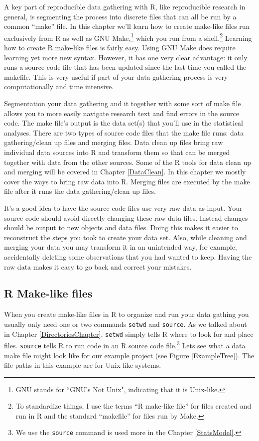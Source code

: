 A key part of reproducible data gathering with R, like reproducible research in general, is segmenting the process into discrete files that can all be run by a common ``make'' file. In this chapter we'll learn how to create make-like files run exclusively from R as well as GNU Make,\footnote{GNU stands for ``GNU's Not Unix", indicating that it is Unix-like.} which you run from a shell.\footnote{To standardize things, I use the terms ``R make-like file'' for files created and run in R and the standard ``makefile'' for files run by Make.} Learning how to create R make-like files is fairly easy. Using GNU Make does require learning yet more new syntax. However, it has one very clear advantage: it only runs a source code file that has been updated since the last time you called the makefile. This is very useful if part of your data gathering process is very computationally and time intensive.

Segmentation your data gathering and it together with some sort of make file allows you to more easily navigate research text and find errors in the source code. The make file's output is the data set(s) that you'll use in the statistical analyses. There are two types of source code files that the make file runs: data gathering/clean up files and merging files. Data clean up files bring raw individual data sources into R and transform them so that can be merged together with data from the other sources. Some of the R tools for data clean up and merging will be covered in Chapter \ref{DataClean}. In this chapter we mostly cover the ways to bring raw data into R. Merging files are executed by the make file after it runs the data gathering/clean up files.

It's a good idea to have the source code files use very raw data as input. Your source code should avoid directly changing these raw data files. Instead changes should be output to new objects and data files. Doing this makes it easier to reconstruct the steps you took to create your data set. Also, while cleaning and merging your data you may transform it in an unintended way, for example, accidentally deleting some observations that you had wanted to keep. Having the raw data makes it easy to go back and correct your mistakes. 

\subsection{R Make-like files}

When you create make-like files in R to organize and run your data gathing you usually only need one or two commands {\tt{setwd}} and {\tt{source}}. As we talked about in Chapter \ref{DirectoriesChapter}, {\tt{setwd}} simply tells R where to look for and place files. {\tt{source}} tells R to run code in an R source code file.\footnote{We use the {\tt{source}} command is used more in the Chapter \ref{StatsModel}.}  Lets see what a data make file might look like for our example project (see Figure \ref{ExampleTree}). The file paths in this example are for Unix-like systems.

